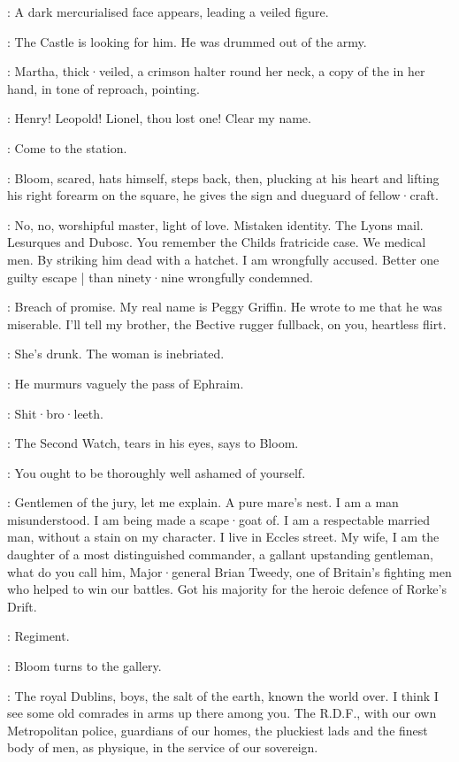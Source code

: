 :
A dark mercurialised face appears,
leading a veiled figure.

\DarkMercury:
The Castle is looking for him.
He was drummed out of the army.

:
Martha,
thick·veiled,
a crimson halter round her neck,
a copy of the 
in her hand,
in tone of reproach,
pointing.

\Martha:
Henry!
Leopold!
Lionel,
thou lost one!
Clear my name.

\FirstWatch[1]:
Come to the station.

:
Bloom,
scared,
hats himself,
steps back,
then,
plucking at his heart and lifting his right forearm on the square,
he gives the sign and dueguard of fellow·craft.

\Bloom:
No,
no,
worshipful master,
light of love.
Mistaken identity.
The Lyons mail.
Lesurques and Dubosc.
You remember the Childs fratricide case.
We medical men.
By striking him dead with a hatchet.
I am wrongfully accused.
Better one guilty escape |
than ninety·nine wrongfully condemned.

\Martha:
Breach of promise.
My real name is Peggy Griffin.
He wrote to me that he was miserable.
I'll tell my brother,
the Bective rugger fullback,
on you,
heartless flirt.

\Bloom:
She's drunk.
The woman is inebriated.

:
He murmurs vaguely the pass of Ephraim.

\Bloom:
Shit·bro·leeth.

:
The Second Watch,
tears in his eyes,
says to Bloom.

\SecondWatch:
You ought to be thoroughly well ashamed of yourself.

\Bloom:
Gentlemen of the jury,
let me explain.
A pure mare's nest.
I am a man misunderstood.
I am being made a scape·goat of.
I am a respectable married man,
without a stain on my character.
I live in Eccles street.
My wife,
I am the daughter of a most distinguished commander,
a gallant upstanding gentleman,
what do you call him,
Major·general Brian Tweedy,
one of Britain's fighting men who helped to win our battles.
Got his majority for the heroic defence of Rorke's Drift.

\FirstWatch:
Regiment.

:
Bloom turns to the gallery.

\Bloom:
The royal Dublins,
boys,
the salt of the earth,
known the world over.
I think I see some old comrades in arms up there among you.
The R.D.F.,
with our own Metropolitan police,
guardians of our homes,
the pluckiest lads and the finest body of men,
as physique,
in the service of our sovereign.

